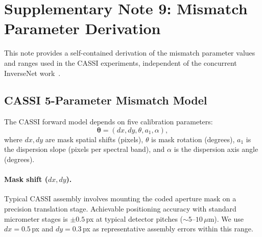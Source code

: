 \documentclass[11pt]{article}
\begin{document}


\newpage
\section{Supplementary Note 9: Mismatch Parameter Derivation}
\label{sec:mismatch_derivation}

This note provides a self-contained derivation of the mismatch parameter
values and ranges used in the CASSI experiments, independent of the
concurrent InverseNet work~\cite{yang2026inversenet}.

\subsection{CASSI 5-Parameter Mismatch Model}

The CASSI forward model depends on five calibration parameters:
\begin{equation}
  \boldsymbol{\theta} = (dx, dy, \theta, a_1, \alpha),
\end{equation}
where $dx, dy$ are mask spatial shifts (pixels), $\theta$ is mask rotation
(degrees), $a_1$ is the dispersion slope (pixels per spectral band), and
$\alpha$ is the dispersion axis angle (degrees).

\paragraph{Mask shift ($dx, dy$).}
Typical CASSI assembly involves mounting the coded aperture mask on a
precision translation stage.  Achievable positioning accuracy with standard
micrometer stages is $\pm 0.5$\,px at typical detector pitches
($\sim 5$--$10\,\mu$m).  We use $dx = 0.5$\,px and $dy = 0.3$\,px as
representative assembly errors within this range.
\end{document}
